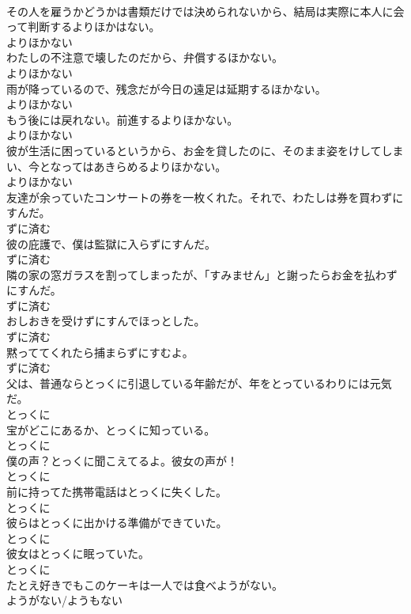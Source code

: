 \documentclass[8pt]{extreport}
\begin{document}
\begin{CJK}{UTF8}{min}
\\	その人を雇うかどうかは書類だけでは決められないから、結局は実際に本人に会って判断するよりほかはない。	
\\	よりほかない
\\	わたしの不注意で壊したのだから、弁償するほかない。	
\\	よりほかない
\\	雨が降っているので、残念だが今日の遠足は延期するほかない。	
\\	よりほかない
\\	もう後には戻れない。前進するよりほかない。	
\\	よりほかない
\\	彼が生活に困っているというから、お金を貸したのに、そのまま姿をけしてしまい、今となってはあきらめるよりほかない。	
\\	よりほかない
\\	友達が余っていたコンサートの券を一枚くれた。それで、わたしは券を買わずにすんだ。	
\\	ずに済む
\\	彼の庇護で、僕は監獄に入らずにすんだ。	
\\	ずに済む
\\	隣の家の窓ガラスを割ってしまったが、「すみません」と謝ったらお金を払わずにすんだ。	
\\	ずに済む
\\	おしおきを受けずにすんでほっとした。	
\\	ずに済む
\\	黙っててくれたら捕まらずにすむよ。	
\\	ずに済む
\\	父は、普通ならとっくに引退している年齢だが、年をとっているわりには元気だ。	
\\	とっくに
\\	宝がどこにあるか、とっくに知っている。	
\\	とっくに
\\	僕の声？とっくに聞こえてるよ。彼女の声が！	
\\	とっくに
\\	前に持ってた携帯電話はとっくに失くした。	
\\	とっくに
\\	彼らはとっくに出かける準備ができていた。	
\\	とっくに
\\	彼女はとっくに眠っていた。	
\\	とっくに
\\	たとえ好きでもこのケーキは一人では食べようがない。	
\\	ようがない/ようもない

\end{CJK}
\end{document}
